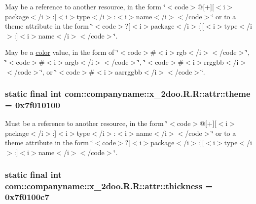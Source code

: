 May be a reference to another resource, in the form \char`\"{}$<$code$>$@\mbox{[}+\mbox{]}\mbox{[}$<$i$>$package$<$/i$>$:\mbox{]}$<$i$>$type$<$/i$>$:$<$i$>$name$<$/i$>$$<$/code$>$\char`\"{} or to a theme attribute in the form \char`\"{}$<$code$>$?\mbox{[}$<$i$>$package$<$/i$>$:\mbox{]}\mbox{[}$<$i$>$type$<$/i$>$:\mbox{]}$<$i$>$name$<$/i$>$$<$/code$>$\char`\"{}. 

May be a \hyperlink{classcom_1_1companyname_1_1x__2doo_1_1_r_1_1color}{color} value, in the form of \char`\"{}$<$code$>$\#$<$i$>$rgb$<$/i$>$$<$/code$>$\char`\"{}, \char`\"{}$<$code$>$\#$<$i$>$argb$<$/i$>$$<$/code$>$\char`\"{}, \char`\"{}$<$code$>$\#$<$i$>$rrggbb$<$/i$>$$<$/code$>$\char`\"{}, or \char`\"{}$<$code$>$\#$<$i$>$aarrggbb$<$/i$>$$<$/code$>$\char`\"{}. \hypertarget{classcom_1_1companyname_1_1x__2doo_1_1_r_1_1attr_4a2ef07a359ea32f3e0192bc0bcb189e}{
\subsubsection[{theme}]{\setlength{\rightskip}{0pt plus 5cm}static final int com::companyname::x\_\-2doo.R.R::attr::theme = 0x7f010100}}
\label{classcom_1_1companyname_1_1x__2doo_1_1_r_1_1attr_4a2ef07a359ea32f3e0192bc0bcb189e}


Must be a reference to another resource, in the form \char`\"{}$<$code$>$@\mbox{[}+\mbox{]}\mbox{[}$<$i$>$package$<$/i$>$:\mbox{]}$<$i$>$type$<$/i$>$:$<$i$>$name$<$/i$>$$<$/code$>$\char`\"{} or to a theme attribute in the form \char`\"{}$<$code$>$?\mbox{[}$<$i$>$package$<$/i$>$:\mbox{]}\mbox{[}$<$i$>$type$<$/i$>$:\mbox{]}$<$i$>$name$<$/i$>$$<$/code$>$\char`\"{}. \hypertarget{classcom_1_1companyname_1_1x__2doo_1_1_r_1_1attr_ebe368917b104183cc0d9e8f392b784e}{
\subsubsection[{thickness}]{\setlength{\rightskip}{0pt plus 5cm}static final int com::companyname::x\_\-2doo.R.R::attr::thickness = 0x7f0100c7}}
\label{classcom_1_1companyname_1_1x__2doo_1_1_r_1_1attr_ebe368917b104183cc0d9e8f392b784e}


